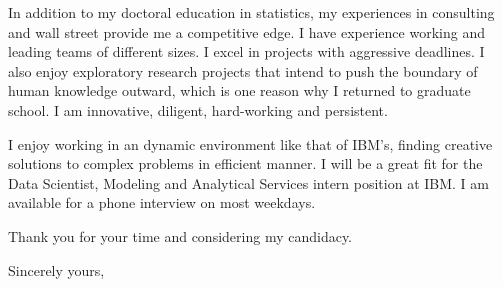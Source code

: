 \documentclass{letter} %
\begin{document}
\begin{letter}
In addition to my doctoral education in statistics, my experiences in consulting and wall street provide me a competitive edge. I have experience working and leading teams of different sizes. I excel in projects with aggressive deadlines. I also enjoy exploratory research projects that intend to push the boundary of human knowledge outward, which is one reason why I returned to graduate school. I am innovative, diligent, hard-working and persistent. 

\noindent %
I enjoy working in an dynamic environment like that of IBM's, finding creative solutions to complex problems in efficient manner. I will be a great fit for the Data Scientist, Modeling and Analytical Services intern position at IBM. I am available for a phone interview on most weekdays. 

Thank you for your time and considering my candidacy. 
 
\closing{Sincerely yours,} 
 

 

\end{letter}
\end{document}
